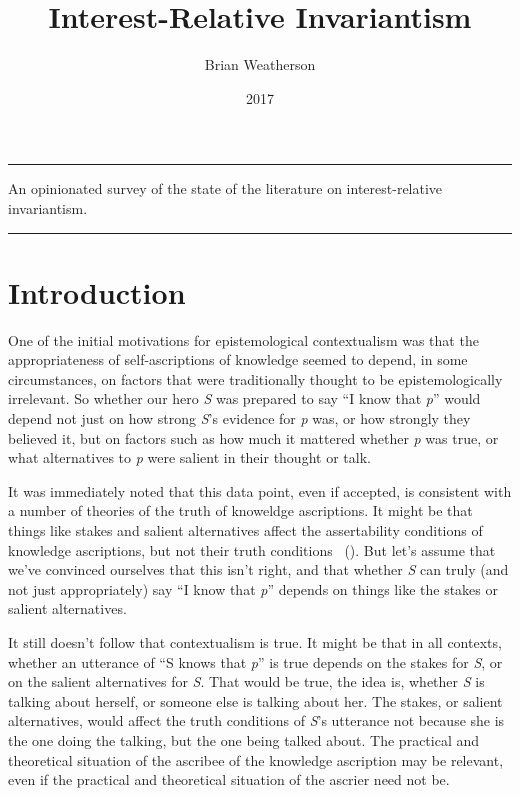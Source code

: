 \documentclass[
  10pt,
  letterpaper,
  DIV=11,
  numbers=noendperiod,
  twoside]{scrartcl}
\title{Interest-Relative Invariantism}
\author{Brian Weatherson}
\date{2017}
\renewenvironment{abstract}
 {\vspace{-1.25cm}
 \quotation\small\noindent\rule{\linewidth}{.5pt}\par\smallskip
 \noindent }
 {\par\noindent\rule{\linewidth}{.5pt}\endquotation}
\begin{document}
\maketitle
\begin{abstract}
An opinionated survey of the state of the literature on
interest-relative invariantism.
\end{abstract}

\section{Introduction}\label{introduction}

One of the initial motivations for epistemological contextualism was
that the appropriateness of self-ascriptions of knowledge seemed to
depend, in some circumstances, on factors that were traditionally
thought to be epistemologically irrelevant. So whether our hero \emph{S}
was prepared to say ``I know that \emph{p}'' would depend not just on
how strong \emph{S}'s evidence for \emph{p} was, or how strongly they
believed it, but on factors such as how much it mattered whether
\emph{p} was true, or what alternatives to \emph{p} were salient in
their thought or talk.

It was immediately noted that this data point, even if accepted, is
consistent with a number of theories of the truth of knoweldge
ascriptions. It might be that things like stakes and salient
alternatives affect the assertability conditions of knowledge
ascriptions, but not their truth conditions
~(). But let's assume that we've
convinced ourselves that this isn't right, and that whether \emph{S} can
truly (and not just appropriately) say ``I know that \emph{p}'' depends
on things like the stakes or salient alternatives.

It still doesn't follow that contextualism is true. It might be that in
all contexts, whether an utterance of ``S knows that \emph{p}'' is true
depends on the stakes for \emph{S}, or on the salient alternatives for
\emph{S}. That would be true, the idea is, whether \emph{S} is talking
about herself, or someone else is talking about her. The stakes, or
salient alternatives, would affect the truth conditions of \emph{S}'s
utterance not because she is the one doing the talking, but the one
being talked about. The practical and theoretical situation of the
ascribee of the knowledge ascription may be relevant, even if the
practical and theoretical situation of the ascrier need not be.
\end{document}
